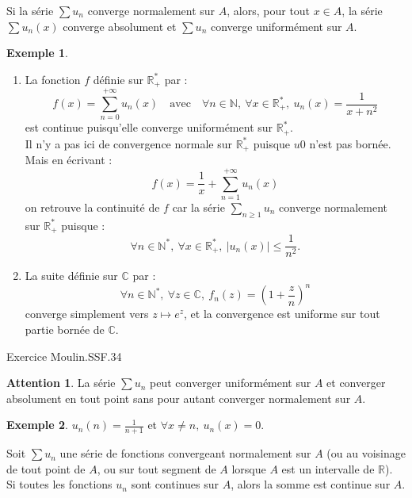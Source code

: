 \documentclass[french]{article}
\newcommand{\N}{\mathbb{N}}
\newcommand{\R}{\mathbb{R}}
\newcommand{\C}{\mathbb{C}}
\newcommand{\st}{^*}
\theoremstyle{plain}
\theoremstyle{definition}
\newtheorem*{ex}{Exemple}
\newtheorem*{attention}{Attention}
\theoremstyle{remark}
\begin{document}
\begin{prop}%
	Si la série $\displaystyle\sum u_n$ converge normalement sur $A$, alors, pour tout $x\in A$, la série $\displaystyle\sum u_n(x)$ converge absolument et $\displaystyle\sum u_n$ converge uniformément sur $A$.
\end{prop}

\begin{ex}
	\begin{enumerate}
		\item La fonction $f$ définie sur $\R_+\st$ par :
		$$f(x)=\sum_{n=0}^{+\infty}u_n(x)\quad\text{avec}\quad\forall n\in\N,\ \forall x\in\R_+\st,\ u_n(x)=\frac{1}{x+n^2}$$ est continue puisqu'elle converge uniformément sur $\R_+\st$.\\
		Il n'y a pas ici de convergence normale sur $\R_+\st$ puisque $u0$ n'est pas bornée. Mais en écrivant :
		$$f(x)=\frac{1}{x}+\sum_{n=1}^{+\infty}u_n(x)$$ on retrouve la continuité de $f$ car la série $\displaystyle\sum_{n\geqslant 1}u_n$ converge normalement sur $\R_+\st$ puisque :
		$$\forall n\in\N\st,\ \forall x\in\R_+\st,\ \lvert u_n(x)\rvert\leqslant\frac{1}{n^2}.$$
		\item La suite définie sur $\C$ par :
		$$\forall n\in\N\st,\ \forall z\in\C,\ f_n(z)=\left(1+\frac{z}{n}\right)^n$$ converge simplement vers $z\mapsto e^z$, et la convergence est uniforme sur tout partie bornée de $\C$.
	\end{enumerate}
\end{ex}

Exercice Moulin.SSF.34

\begin{attention}
	La série $\displaystyle\sum u_n$ peut converger uniformément sur $A$ et converger absolument en tout point sans pour autant converger normalement sur $A$.
\end{attention}


\begin{ex}
	$u_n(n)=\frac{1}{n+1}$ et $\forall x\ne n,\ u_n(x)=0$.
\end{ex}

\begin{cor}%
	Soit $\displaystyle\sum u_n$ une série de fonctions convergeant normalement sur $A$ (ou au voisinage de tout point de $A$, ou sur tout segment de $A$ lorsque $A$ est un intervalle de $\R$).\\
	Si toutes les fonctions $u_n$ sont continues sur $A$, alors la somme est continue sur $A$.
\end{cor}
\end{document}
